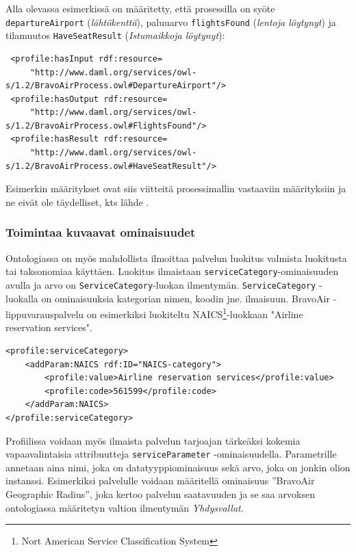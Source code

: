 \documentclass[finnish]{tktltiki2}
\theoremstyle{definition}
\theoremstyle{remark}
\begin{document}
Alla olevassa esimerkissä on määritetty, että prosessilla on syöte \texttt{departureAirport} (\textit{lähtökenttä}), paluuarvo \texttt{flightsFound} (\textit{lentoja löytynyt}) ja 
tilamuutos \texttt{HaveSeatResult} (\textit{Istumaikkoja löytynyt})\cite{daml}:

\footnotesize
\begin{verbatim}
 <profile:hasInput rdf:resource=
     "http://www.daml.org/services/owl-s/1.2/BravoAirProcess.owl#DepartureAirport"/>
 <profile:hasOutput rdf:resource=
     "http://www.daml.org/services/owl-s/1.2/BravoAirProcess.owl#FlightsFound"/>
 <profile:hasResult rdf:resource=
     "http://www.daml.org/services/owl-s/1.2/BravoAirProcess.owl#HaveSeatResult"/>
\end{verbatim}
\normalsize

Esimerkin määritykset ovat siis viitteitä prosessimallin vastaaviin määrityksiin ja ne eivät ole täydelliset, kts lähde \cite{daml}.

\subsubsection{Toimintaa kuvaavat ominaisuudet}

Ontologiassa on myös mahdollista ilmoittaa palvelun luokitus valmista luokitusta tai taksonomiaa käyttäen. Luokitus ilmaistaan \texttt{serviceCategory}-ominaisuuden avulla ja arvo on \texttt{ServiceCategory}-luokan ilmentymän.  \texttt{ServiceCategory} -luokalla on ominaisuuksia kategorian nimen, koodin jne. ilmaisuun\cite{OWLS}. BravoAir -lippuvarauspalvelu on esimerkiksi luokiteltu NAICS\footnote{Nort American Service Classification System}-luokkaan "Airline reservation services"\cite{daml}.

\footnotesize
\begin{verbatim}
<profile:serviceCategory>
    <addParam:NAICS rdf:ID="NAICS-category">
        <profile:value>Airline reservation services</profile:value>
        <profile:code>561599</profile:code>
    </addParam:NAICS>
</profile:serviceCategory>
\end{verbatim}
\normalsize

Profiilissa voidaan myös ilmaista palvelun tarjoajan tärkeäksi kokemia vapaavalintaisia attribuutteja \texttt{serviceParameter} -ominaisuudella. Parametrille annetaan aina nimi, joka on datatyyppiominaisuus sekä arvo, joka on jonkin olion instanssi\cite{OWLS}. Esimerkiksi palvelulle voidaan määritellä ominaisuus ''BravoAir Geographic Radius'', joka kertoo palvelun saatavuuden ja se saa arvoksen ontologiassa määritetyn valtion ilmentymän  \textit{Yhdysvallat}.
\end{document}
